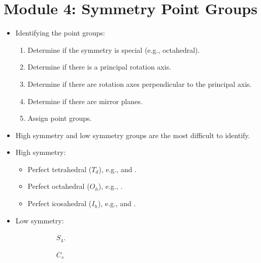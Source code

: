 \documentclass[../main.tex]{subfiles}
\begin{document}
\section{Module 4: Symmetry Point Groups}
\begin{itemize}
    \item Identifying the point groups:
    \begin{enumerate}
        \item Determine if the symmetry is special (e.g., octahedral).
        \item Determine if there is a principal rotation axis.
        \item Determine if there are rotation axes perpendicular to the principal axis.
        \item Determine if there are mirror planes.
        \item Assign point groups.
    \end{enumerate}
    \item High symmetry and low symmetry groups are the most difficult to identify.
    \item High symmetry:
    \begin{itemize}
        \item Perfect tetrahedral ($T_d$), e.g.,  and .
        \item Perfect octahedral ($O_h$), e.g., .
        \item Perfect icosahedral ($I_h$), e.g.,  and .
    \end{itemize}
    \item Low symmetry:
    \begin{figure}[h!]
        \centering
        \begin{subfigure}[b]{0.24\linewidth}
            \centering
            \footnotesize
            \caption{$S_4$.}
            \label{fig:lowSymmetrya}
        \end{subfigure}
        \begin{subfigure}[b]{0.24\linewidth}
            \centering
            \footnotesize
            \caption{$C_s$}
            \label{fig:lowSymmetryb}
        \end{subfigure}
        \begin{subfigure}[b]{0.24\linewidth}
            \centering
            \footnotesize

\end{subfigure}
\end{figure}
\end{itemize}
\end{document}
